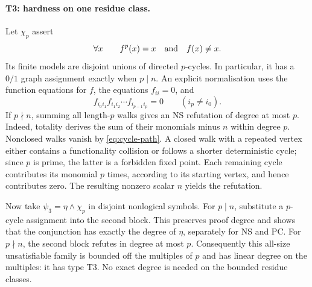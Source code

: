 \documentclass[11pt,a4paper]{article}
\theoremstyle{definition}\newtheorem{definition}[theorem]{Definition}
\theoremstyle{remark}\newtheorem{remark}[theorem]{Remark}
\begin{document}
\paragraph{T3: hardness on one residue class.}
Let $\chi_p$ assert
\[
 \forall x\qquad f^p(x)=x\quad\hbox{and}\quad f(x)\ne x.
\]
Its finite models are disjoint unions of directed $p$-cycles. In particular,
it has a $0/1$ graph assignment exactly when $p\mid n$. An explicit
normalisation uses the function equations for $f$, the equations $f_{ii}=0$,
and
\begin{equation}\label{eq:cycle-path}
 f_{i_0i_1}f_{i_1i_2}\cdots f_{i_{p-1}i_p}=0
 \qquad(i_p\ne i_0).
\end{equation}
If $p\nmid n$, summing all length-$p$ walks gives an NS refutation of degree
at most $p$. Indeed, totality derives the sum of their monomials minus $n$
within degree $p$. Nonclosed walks vanish by \eqref{eq:cycle-path}.
A closed walk with a repeated vertex either contains a functionality
collision or follows a shorter deterministic cycle; since $p$ is prime,
the latter is a forbidden fixed point. Each remaining cycle contributes its
monomial $p$ times, according to its starting vertex, and hence contributes
zero. The resulting nonzero scalar $n$ yields the refutation.

Now take $\psi_3=\eta\wedge\chi_p$ in disjoint nonlogical symbols.
For $p\mid n$, substitute a $p$-cycle assignment into the second block.
This preserves proof degree and shows that the conjunction has exactly the
degree of $\eta$, separately for NS and PC. For $p\nmid n$, the second
block refutes in degree at most $p$. Consequently this all-size
unsatisfiable family is bounded off the multiples of $p$ and has linear
degree on the multiples: it has type T3. No exact degree is needed on the
bounded residue classes.
\end{document}
